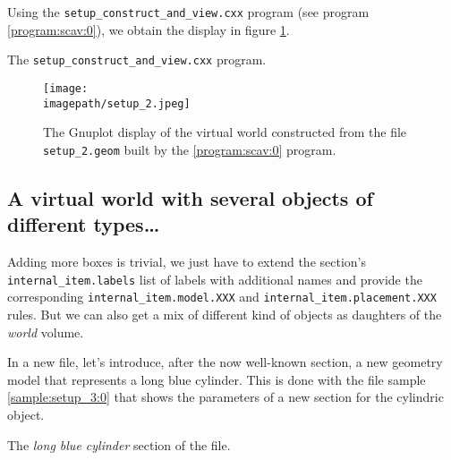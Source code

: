 Using   the   \texttt{setup\_construct\_and\_view.cxx}  program   (see
program  \ref{program:scav:0}),  we   obtain  the  display  in  figure
\ref{fig:setup_2:0}. 

\begin{program}[hp]
\caption{The \texttt{setup\_construct\_and\_view.cxx} program.}
\label{program:scav:0}
\end{program}

\begin{figure}[h]
\begin{center}
\texttt{[image: \\imagepath/setup\_2.jpeg]}
\end{center}
\caption{The Gnuplot  display of the  virtual world constructed
  from   the   file   \texttt{setup\_2.geom}  built   by   the
  \ref{program:scav:0} program.}\label{fig:setup_2:0}
\end{figure}


\clearpage

\subsection{A virtual world with several objects of different types\dots}

Adding more  boxes is trivial, we  just have to  extend the 
section's   \texttt{internal\_item.labels}   list   of   labels   with
additional      names      and      provide     the      corresponding
\texttt{internal\_item.model.XXX}                                   and
\texttt{internal\_item.placement.XXX}  rules.  But we  can also  get a
mix  of different  kind of  objects as  daughters of  the \emph{world}
volume.  

In  a new    file, let's  introduce,  after the  now
well-known   section,  a new  geometry  model that
represents a  long blue cylinder.  This  is done with  the file sample
\ref{sample:setup_3:0} that shows the  parameters of a new section for
the cylindric object.

\begin{sample}[h]
\caption{The \emph{long blue cylinder}
  section of the   file.}
\label{sample:setup_3:0}
\end{sample}

